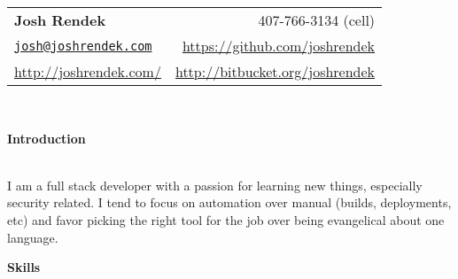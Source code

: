 \documentclass[a4paper,11pt,sans]{article}
\newcommand{\resheading}[1]{{\large \colorbox{myblue}{\begin{minipage}{\textwidth}{\textbf{#1 \vphantom{p\^{E}}}}\end{minipage}}}}
\begin{document}
\newcommand{\infoheader}{
\begin{tabular*}{7.5in}{l@{\extracolsep{\fill}}r}
\textbf{\LARGE Josh Rendek }  & 407-766-3134 (cell) \\
\href{mailto:josh@joshrendek.com}{\nolinkurl{josh@joshrendek.com}} & \url{https://github.com/joshrendek} \\
\url{http://joshrendek.com/} & \url{http://bitbucket.org/joshrendek} \\
\end{tabular*}
\\

\vspace{0.1in}
}

\newcommand{\pagebreakwithheader}{\pagebreak\infoheader}

\infoheader

\resheading{\color{white} Introduction}
\hspace{3pt} \\
I am a full stack developer with a passion for learning new things, especially security related. I tend to focus on automation over manual (builds, deployments, etc)
and favor picking the right tool for the job over being evangelical about one language.
\linebreak

\resheading{\color{white} Skills}
\end{document}
